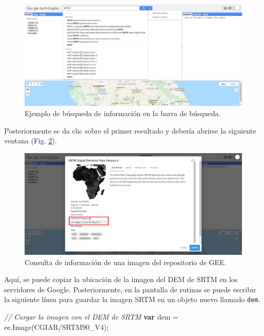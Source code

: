 \documentclass[
  12pt,
  letterpaper,
  twoside]{book}
\newenvironment{Shaded}{\begin{snugshade}}{\end{snugshade}}
\newcommand{\CommentTok}[1]{\textcolor[rgb]{0.24,0.58,0.00}{\textit{#1}}}
\newcommand{\ControlFlowTok}[1]{\textcolor[rgb]{0.00,0.00,0.00}{\textbf{#1}}}
\newcommand{\FunctionTok}[1]{\textcolor[rgb]{0.48,0.12,0.64}{#1}}
\newcommand{\KeywordTok}[1]{\textcolor[rgb]{0.48,0.12,0.64}{#1}}
\newcommand{\NormalTok}[1]{#1}
\newcommand{\OperatorTok}[1]{\textcolor[rgb]{0.00,0.00,0.00}{#1}}
\newcommand{\StringTok}[1]{\textcolor[rgb]{0.87,0.29,0.22}{#1}}
\begin{document}
\begin{figure}[H]

{\centering \includegraphics[width=0.95\linewidth]{Img/SRTM} 

}

\caption{Ejemplo de búsqueda de información en la barra de búsqueda.}\label{fig:f910}
\end{figure}

Posteriormente se da clic sobre el primer resultado y debería abrirse la siguiente ventana (\textcolor{darkblue}{Fig.} \ref{fig:f911}).

\begin{figure}[H]

{\centering \includegraphics[width=0.95\linewidth]{Img/SRTM_prop} 

}

\caption{Consulta de información de una imagen del repositorio de GEE.}\label{fig:f911}
\end{figure}

Aquí, se puede copiar la ubicación de la imagen del DEM de SRTM en los servidores de Google. Posteriormente, en la pantalla de rutinas se puede escribir la siguiente línea para guardar la imagen SRTM en un objeto nuevo llamado \texttt{dem}.

\begin{Shaded}
\begin{Highlighting}[]
\CommentTok{// Cargar la imagen con el DEM de SRTM}
\ControlFlowTok{var}\NormalTok{ dem }\OperatorTok{=} \KeywordTok{ee}\OperatorTok{.}\FunctionTok{Image}\NormalTok{(}\StringTok{\textquotesingle{}CGIAR/SRTM90\_V4\textquotesingle{}}\NormalTok{)}\OperatorTok{;}
\end{Highlighting}
\end{Shaded}
\end{document}
